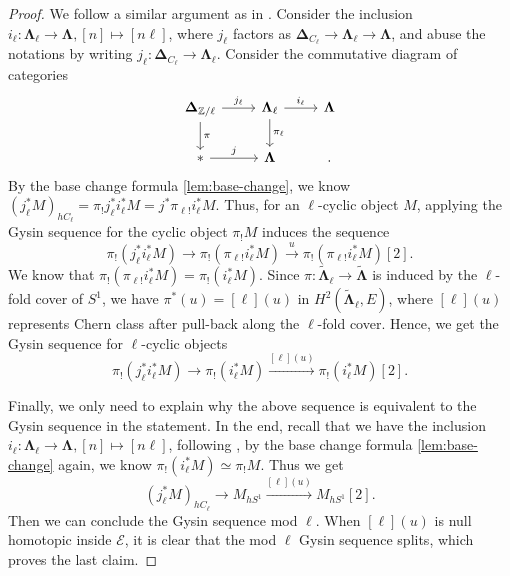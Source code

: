 \documentclass[11pt]{amsart}
\numberwithin{equation}{section}
\theoremstyle{plain}
\theoremstyle{definition}
\theoremstyle{remark}
\newcommand{\bZ} { {\mathbb{Z}}}
\newcommand{\cE} { {\mathcal{E}}}
\begin{document}
\begin{proof}
    We follow a similar argument as in \cite[Lemma 7.5]{Kaledin}. Consider the inclusion $i_\ell: \boldsymbol{\Lambda}_\ell \to \boldsymbol{\Lambda}, [n] \mapsto [n \ell]$, where $j_\ell$ factors as $\boldsymbol{\Delta}_{C_\ell} \to \boldsymbol{\Lambda}_\ell \to \boldsymbol{\Lambda}$, and abuse the notations by writing $j_\ell: \boldsymbol{\Delta}_{C_\ell} \to \boldsymbol{\Lambda}_\ell$. 
    Consider the commutative diagram of categories
    \[\begin{tikzcd}
    \boldsymbol{\Delta}_{\bZ/\ell} \arrow[r, "{j_\ell}"] \arrow[d, "\pi"] & \boldsymbol{\Lambda}_\ell \arrow[d, "\pi_\ell"] \ar[r, "i_\ell"] & \boldsymbol{\Lambda} \\
    * \arrow[r, "j"] & \boldsymbol{\Lambda} &.
    \end{tikzcd}\]
    By the base change formula \autoref{lem:base-change},
    we know $(j_\ell^*M)_{hC_\ell} = \pi_{!} j_\ell^*i_\ell^*M = {j}^*\pi_{\ell!}i_\ell^*M$. Thus, for an $\ell$-cyclic object $M$, applying the Gysin sequence for the cyclic object $\pi_!M$ induces the sequence
    \[\pi_!(j_\ell^*i_\ell^* M) \to \pi_!(\pi_{\ell!}i_\ell^*M) \xrightarrow{u} \pi_!(\pi_{\ell!}i_\ell^*M)[2] .\]
    We know that $\pi_!(\pi_{\ell!}i_\ell^*M) = \pi_!(i_\ell^*M)$. Since $\pi: \boldsymbol{\widetilde{\Lambda}}_\ell \to \boldsymbol{\widetilde{\Lambda}}$ is induced by the $\ell$-fold cover of $S^1$, we have $\pi^*(u) = [\ell](u)$ in $H^2(\boldsymbol{\widetilde{\Lambda}}_\ell, E)$, where $[\ell](u)$ represents Chern class after pull-back along the $\ell$-fold cover. Hence, we get the Gysin sequence for $\ell$-cyclic objects
    \[\pi_!(j_\ell^*i_\ell^*M) \to \pi_!(i_\ell^*M) \xrightarrow{[\ell](u)} \pi_!(i_\ell^*M)[2].\]
    
    Finally, we only need to explain why the above sequence is equivalent to the Gysin sequence in the statement. In the end, recall that we have the inclusion $i_\ell: \boldsymbol{\Lambda}_\ell \to \boldsymbol{\Lambda}, [n] \mapsto [n \ell]$, following \cite[Lemma 7.1]{Kaledin}, by the base change formula \autoref{lem:base-change} again, we know $\pi_!(i_\ell^*M ) \simeq \pi_!M$. Thus we get
    \[(j_\ell^*M)_{hC_\ell} \to M_{hS^1} \xrightarrow{[\ell] (u)} M_{hS^1}[2].\]
    Then we can conclude the Gysin sequence mod $\ell$. When $[\ell](u) $ is null homotopic inside $\cE$, it is clear that the mod $\ell$ Gysin sequence splits, which proves the last claim.\end{proof}
\end{document}
